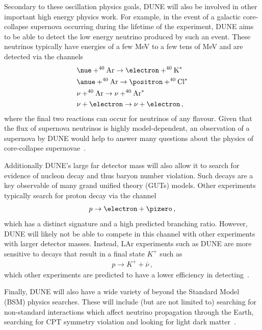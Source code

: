 Secondary to these oscillation physics goals, DUNE will also be involved in other important high energy physics work.
For example, in the event of a galactic core-collapse supernova occurring during the lifetime of the experiment, DUNE aims to be able to detect the low energy neutrino produced by such an event.
These neutrinos typically have energies of a few \si{\mega\electronvolt} to a few tens of \si{\mega\electronvolt} and are detected via the channels
\begin{align}
  &\nue + ^{40}\text{Ar} \rightarrow \electron + ^{40}\text{K}^{*} \\
  &\anue + ^{40}\text{Ar} \rightarrow \positron + ^{40}\text{Cl}^{*} \\
  &\nu + ^{40}\text{Ar} \rightarrow \nu + ^{40}\text{Ar}^{*} \\
  &\nu + \electron \rightarrow \nu + \electron \, ,
\end{align}
where the final two reactions can occur for neutrinos of any flavour.
Given that the flux of supernova neutrinos is highly model-dependent, an observation of a supernova by DUNE would help to answer many questions about the physics of core-collapse supernovae~\cite{duneSupernova}. 

Additionally DUNE's large far detector mass will also allow it to search for evidence of nucleon decay and thus baryon number violation.
Such decays are a key observable of many grand unified theory (GUTs) models.
Other experiments typically search for proton decay via the channel
\begin{align}
  p \rightarrow \electron + \pizero \, ,
\end{align}
which has a distinct signature and a high predicted branching ratio.
However, DUNE will likely not be able to compete in this channel with other experiments with larger detector masses.
Instead, LAr experiments such as DUNE are more sensitive to decays that result in a final state $K^{+}$ such as 
\begin{align}
  p \rightarrow K^{+} + \overline{\nu} \, ,
\end{align}
which other experiments are predicted to have a lower efficiency in detecting~\cite{duneNDK}.

Finally, DUNE will also have a wide variety of beyond the Standard Model (BSM) physics searches.
These will include (but are not limited to) searching for non-standard interactions which affect neutrino propagation through the Earth, searching for CPT symmetry violation and looking for light dark matter~\cite{tdrVol2}.

